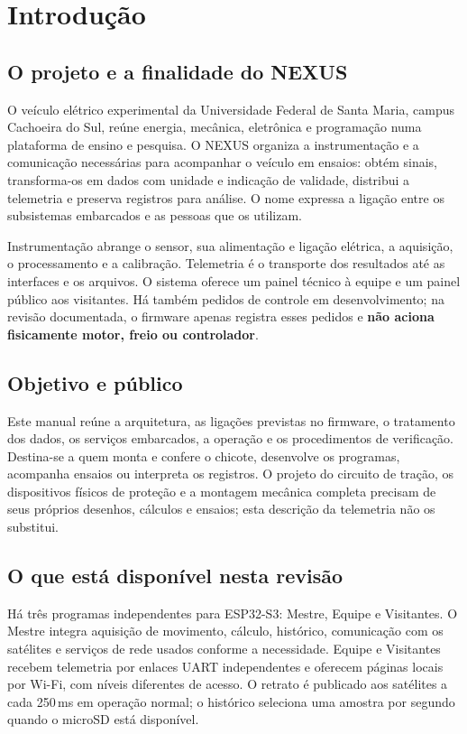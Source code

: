 \chapter{Introdução}
\section{O projeto e a finalidade do NEXUS}
O veículo elétrico experimental da Universidade Federal de Santa Maria, campus Cachoeira do Sul, reúne energia, mecânica, eletrônica e programação numa plataforma de ensino e pesquisa. O NEXUS organiza a instrumentação e a comunicação necessárias para acompanhar o veículo em ensaios: obtém sinais, transforma-os em dados com unidade e indicação de validade, distribui a telemetria e preserva registros para análise. O nome expressa a ligação entre os subsistemas embarcados e as pessoas que os utilizam.

Instrumentação abrange o sensor, sua alimentação e ligação elétrica, a aquisição, o processamento e a calibração. Telemetria é o transporte dos resultados até as interfaces e os arquivos. O sistema oferece um painel técnico à equipe e um painel público aos visitantes. Há também pedidos de controle em desenvolvimento; na revisão documentada, o firmware apenas registra esses pedidos e \textbf{não aciona fisicamente motor, freio ou controlador}.

\section{Objetivo e público}
Este manual reúne a arquitetura, as ligações previstas no firmware, o tratamento dos dados, os serviços embarcados, a operação e os procedimentos de verificação. Destina-se a quem monta e confere o chicote, desenvolve os programas, acompanha ensaios ou interpreta os registros. O projeto do circuito de tração, os dispositivos físicos de proteção e a montagem mecânica completa precisam de seus próprios desenhos, cálculos e ensaios; esta descrição da telemetria não os substitui.

\section{O que está disponível nesta revisão}
Há três programas independentes para ESP32-S3: Mestre, Equipe e Visitantes. O Mestre integra aquisição de movimento, cálculo, histórico, comunicação com os satélites e serviços de rede usados conforme a necessidade. Equipe e Visitantes recebem telemetria por enlaces UART independentes e oferecem páginas locais por Wi-Fi, com níveis diferentes de acesso. O retrato é publicado aos satélites a cada 250\,ms em operação normal; o histórico seleciona uma amostra por segundo quando o microSD está disponível.

